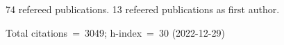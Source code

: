 74 refereed publications. 13 refeered publications as first author.

Total citations~=~3049; h-index~=~30 (2022-12-29)